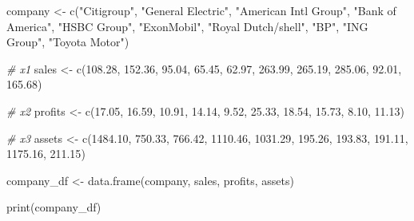 \documentclass[
]{article}
\newenvironment{Shaded}{\begin{snugshade}}{\end{snugshade}}
\newcommand{\CommentTok}[1]{\textcolor[rgb]{0.56,0.35,0.01}{\textit{#1}}}
\newcommand{\FloatTok}[1]{\textcolor[rgb]{0.00,0.00,0.81}{#1}}
\newcommand{\FunctionTok}[1]{\textcolor[rgb]{0.00,0.00,0.00}{#1}}
\newcommand{\NormalTok}[1]{#1}
\newcommand{\OtherTok}[1]{\textcolor[rgb]{0.56,0.35,0.01}{#1}}
\newcommand{\StringTok}[1]{\textcolor[rgb]{0.31,0.60,0.02}{#1}}
\begin{document}
\begin{Shaded}
\begin{Highlighting}[]
\NormalTok{company }\OtherTok{\textless{}{-}} \FunctionTok{c}\NormalTok{(}\StringTok{"Citigroup"}\NormalTok{, }\StringTok{"General Electric"}\NormalTok{, }\StringTok{"American Intl Group"}\NormalTok{, }\StringTok{"Bank of America"}\NormalTok{, }\StringTok{"HSBC Group"}\NormalTok{, }\StringTok{"ExonMobil"}\NormalTok{, }\StringTok{"Royal Dutch/shell"}\NormalTok{, }\StringTok{"BP"}\NormalTok{, }\StringTok{"ING Group"}\NormalTok{, }\StringTok{"Toyota Motor"}\NormalTok{)}

\CommentTok{\# x1}
\NormalTok{sales }\OtherTok{\textless{}{-}} \FunctionTok{c}\NormalTok{(}\FloatTok{108.28}\NormalTok{, }\FloatTok{152.36}\NormalTok{, }\FloatTok{95.04}\NormalTok{, }\FloatTok{65.45}\NormalTok{, }\FloatTok{62.97}\NormalTok{, }\FloatTok{263.99}\NormalTok{, }\FloatTok{265.19}\NormalTok{, }\FloatTok{285.06}\NormalTok{, }\FloatTok{92.01}\NormalTok{, }\FloatTok{165.68}\NormalTok{)}

\CommentTok{\# x2}
\NormalTok{profits }\OtherTok{\textless{}{-}} \FunctionTok{c}\NormalTok{(}\FloatTok{17.05}\NormalTok{, }\FloatTok{16.59}\NormalTok{, }\FloatTok{10.91}\NormalTok{, }\FloatTok{14.14}\NormalTok{, }\FloatTok{9.52}\NormalTok{, }\FloatTok{25.33}\NormalTok{, }\FloatTok{18.54}\NormalTok{, }\FloatTok{15.73}\NormalTok{, }\FloatTok{8.10}\NormalTok{, }\FloatTok{11.13}\NormalTok{)}

\CommentTok{\# x3}
\NormalTok{assets }\OtherTok{\textless{}{-}} \FunctionTok{c}\NormalTok{(}\FloatTok{1484.10}\NormalTok{, }\FloatTok{750.33}\NormalTok{, }\FloatTok{766.42}\NormalTok{, }\FloatTok{1110.46}\NormalTok{, }\FloatTok{1031.29}\NormalTok{, }\FloatTok{195.26}\NormalTok{, }\FloatTok{193.83}\NormalTok{, }\FloatTok{191.11}\NormalTok{, }\FloatTok{1175.16}\NormalTok{, }\FloatTok{211.15}\NormalTok{)}

\NormalTok{company\_df }\OtherTok{\textless{}{-}} \FunctionTok{data.frame}\NormalTok{(company,}
\NormalTok{                         sales,}
\NormalTok{                         profits,}
\NormalTok{                         assets)}
\end{Highlighting}
\end{Shaded}

\begin{Shaded}
\begin{Highlighting}[]
\FunctionTok{print}\NormalTok{(company\_df)}
\end{Highlighting}
\end{Shaded}
\end{document}
